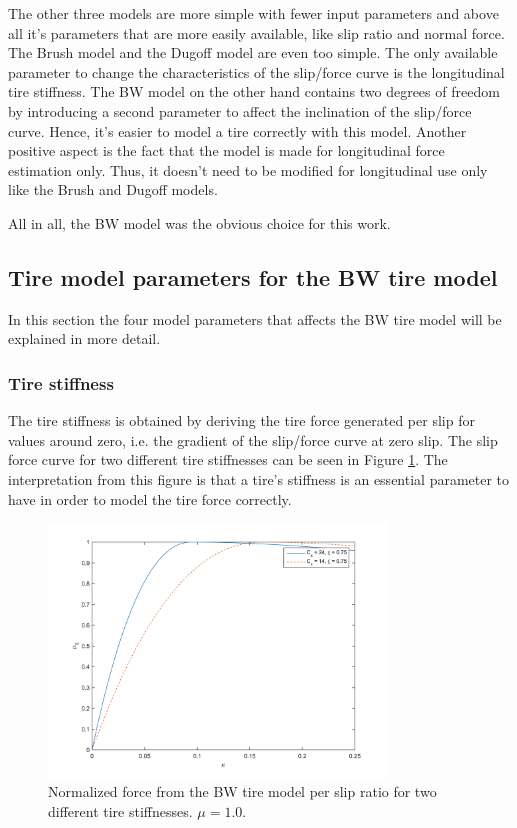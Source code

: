 The other three models are more simple with fewer input parameters and above all it's parameters that are more easily available, like slip ratio and normal force. The Brush model and the Dugoff model are even too simple. The only available parameter to change the characteristics of the slip/force curve is the longitudinal tire stiffness. The BW model on the other hand contains two degrees of freedom by introducing a second parameter to affect the inclination of the slip/force curve. Hence, it's easier to model a tire correctly with this model. Another positive aspect is the fact that the model is made for longitudinal force estimation only. Thus, it doesn't need to be modified for longitudinal use only like the Brush and Dugoff models.

All in all, the BW model was the obvious choice for this work.

\subsection{Tire model parameters for the BW tire model}
In this section the four model parameters that affects the BW tire model will be explained in more detail.

\subsubsection{Tire stiffness}
The tire stiffness is obtained by deriving the tire force generated per slip for values around zero, i.e. the gradient of the slip/force curve at zero slip. The slip force curve for two different tire stiffnesses can be seen in Figure \ref{different_cx}. The interpretation from this figure is that a tire's stiffness is an essential parameter to have in order to model the tire force correctly. 

\begin{figure}[h]
	\centering
	\includegraphics[width=0.8\textwidth]{Pictures/slipkraft_olika_cx}
	\caption {Normalized force from the BW tire model per slip ratio for two different tire stiffnesses. $ \mu = 1.0 $.}
	\label{different_cx}
\end{figure}


